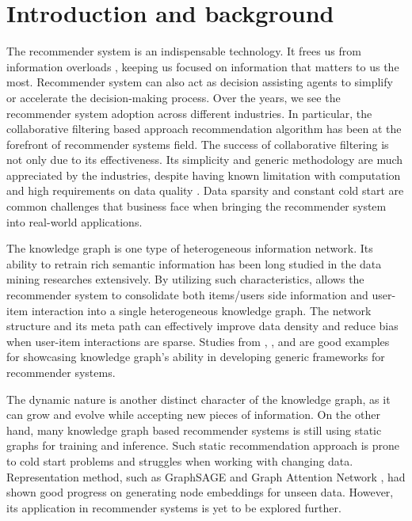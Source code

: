 
\section{Introduction and background}
The recommender system is an indispensable technology. It frees us from information overloads \citep{Lu2015}, keeping us focused on information that matters to us the most. Recommender system can also act as decision assisting agents to simplify or accelerate the decision-making process. Over the years, we see the recommender system adoption across different industries. In particular, the collaborative filtering based approach recommendation algorithm has been at the forefront of recommender systems field. The success of collaborative filtering is not only due to its effectiveness. Its simplicity and generic methodology are much appreciated by the industries, despite having known limitation with computation and high requirements on data quality \citep{Amatriain2016}. Data sparsity and constant cold start are common challenges that business face when bringing the recommender system into real-world applications. 

The knowledge graph is one type of heterogeneous information network. Its ability to retrain rich semantic information has been long studied in the data mining researches \citep{Song2019} extensively. By utilizing such characteristics, allows the recommender system to consolidate both items/users side information and user-item interaction into a single heterogeneous knowledge graph. The network structure and its meta path can effectively improve data density and reduce bias when user-item interactions are sparse. Studies from \citet{qin2020survey}, \citet{wang2018ripplenet}, and \citet{xi2020graph} are good examples for showcasing knowledge graph's ability in developing generic frameworks for recommender systems.

The dynamic nature is another distinct character of the knowledge graph, as it can grow and evolve while accepting new pieces of information.  On the other hand, many knowledge graph based recommender systems is still using static graphs for training and inference. Such static recommendation approach is prone to cold start problems and struggles when working with changing data. Representation method, such as GraphSAGE \citep{hamilton2017inductive} and Graph Attention Network \citep{velivckovic2017graph}, had shown good progress on generating node embeddings for unseen data. However, its application in recommender systems is yet to be explored further.

